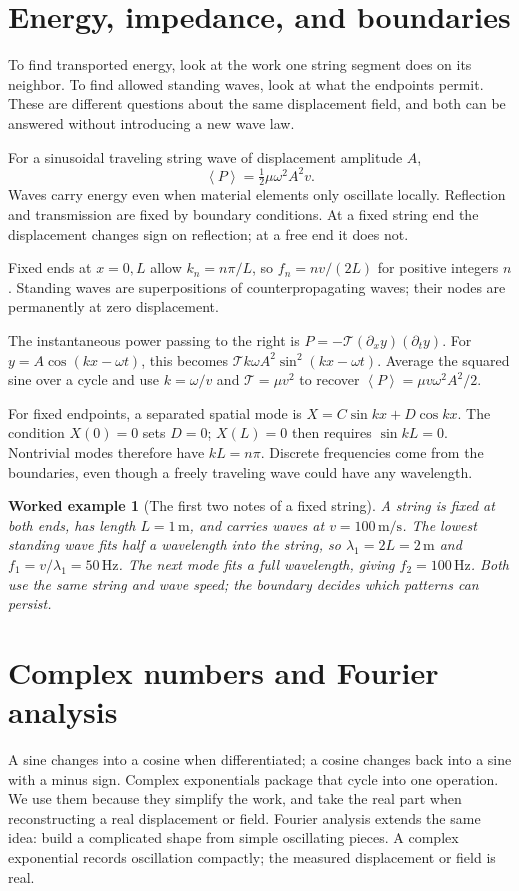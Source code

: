 \documentclass[11pt,oneside]{book}
\newcommand{\avg}[1]{\left\langle #1\right\rangle}
\theoremstyle{reviewstyle}
\newtheorem{example}{Worked example}[chapter]
\begin{document}
\section{Energy, impedance, and boundaries}
To find transported energy, look at the work one string segment does on its neighbor. To find allowed standing waves, look at what the endpoints permit. These are different questions about the same displacement field, and both can be answered without introducing a new wave law.

For a sinusoidal traveling string wave of displacement amplitude $A$,
\begin{equation}
\avg{P}=\tfrac12\mu\omega^2A^2v.
\end{equation}
Waves carry energy even when material elements only oscillate locally. Reflection and transmission are fixed by boundary conditions. At a fixed string end the displacement changes sign on reflection; at a free end it does not.

Fixed ends at $x=0,L$ allow $k_n=n\pi/L$, so $f_n=nv/(2L)$ for positive integers $n$. Standing waves are superpositions of counterpropagating waves; their nodes are permanently at zero displacement.

The instantaneous power passing to the right is $P=-\mathcal T(\partial_xy)(\partial_ty)$. For $y=A\cos(kx-\omega t)$, this becomes $\mathcal T k\omega A^2\sin^2(kx-\omega t)$. Average the squared sine over a cycle and use $k=\omega/v$ and $\mathcal T=\mu v^2$ to recover $\avg P=\mu v\omega^2A^2/2$.

For fixed endpoints, a separated spatial mode is $X=C\sin kx+D\cos kx$. The condition $X(0)=0$ sets $D=0$; $X(L)=0$ then requires $\sin kL=0$. Nontrivial modes therefore have $kL=n\pi$. Discrete frequencies come from the boundaries, even though a freely traveling wave could have any wavelength.

\begin{example}[The first two notes of a fixed string]
A string is fixed at both ends, has length $L=1\,\mathrm m$, and carries waves at $v=100\,\mathrm{m/s}$. The lowest standing wave fits half a wavelength into the string, so $\lambda_1=2L=2\,\mathrm m$ and $f_1=v/\lambda_1=50\,\mathrm{Hz}$. The next mode fits a full wavelength, giving $f_2=100\,\mathrm{Hz}$. Both use the same string and wave speed; the boundary decides which patterns can persist.
\end{example}

\section{Complex numbers and Fourier analysis}
A sine changes into a cosine when differentiated; a cosine changes back into a sine with a minus sign. Complex exponentials package that cycle into one operation. We use them because they simplify the work, and take the real part when reconstructing a real displacement or field. Fourier analysis extends the same idea: build a complicated shape from simple oscillating pieces. A complex exponential records oscillation compactly; the measured displacement or field is real.
\end{document}
